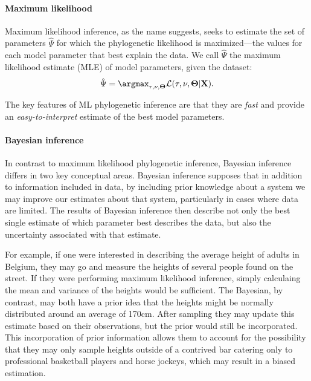 \paragraph*{Maximum likelihood}
Maximum likelihood inference, as the name suggests, seeks to estimate the set of parameters $\hat{\Psi}$ for which the phylogenetic likelihood is maximized---the values for each model parameter that best explain the data.
We call $\hat{\Psi}$ the maximum likelihood estimate (MLE) of model parameters, given the dataset:
\begin{equation}
  \hat{\Psi} = \argmax_{\tau,\mathbf{\nu},\mathbf{\Theta}} \mathcal{L}(\tau, \mathbf{\nu},\mathbf{\Theta} | \mathbf{X}).
\end{equation}

The key features of ML phylogenetic inference are that they are \textit{fast} and provide an \textit{easy-to-interpret} estimate of the best model parameters.

\paragraph*{Bayesian inference}
In contrast to maximum likelihood phylogenetic inference, Bayesian inference differs in two key conceptual areas.
Bayesian inference supposes that in addition to information included in data, by including prior knowledge about a system we may improve our estimates about that system, particularly in cases where data are limited.
The results of Bayesian inference then describe not only the best single estimate of which parameter best describes the data, but also the uncertainty associated with that estimate.

For example, if one were interested in describing the average height of adults in Belgium, they may go and measure the heights of several people found on the street.
If they were performing maximum likelihood inference, simply calculaing the mean and variance of the heights would be sufficient.
The Bayesian, by contrast, may both have a prior idea that the heights might be normally distributed around an average of 170cm.
After sampling they may update this estimate based on their observations, but the prior would still be incorporated.
This incorporation of prior information allows them to account for the possibility that they may only sample heights outside of a contrived bar catering only to professional basketball players and horse jockeys, which may result in a biased estimation.

